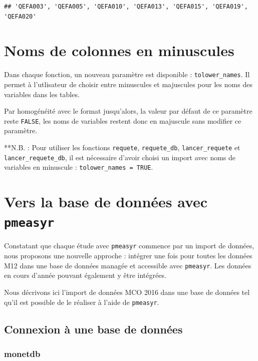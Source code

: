 \documentclass[]{book}
\theoremstyle{definition}
\theoremstyle{definition}
\theoremstyle{definition}
\theoremstyle{remark}
\begin{document}
\begin{verbatim}
## 'QEFA003', 'QEFA005', 'QEFA010', 'QEFA013', 'QEFA015', 'QEFA019', 'QEFA020'
\end{verbatim}

\chapter{Noms de colonnes en
minuscules}\label{noms-de-colonnes-en-minuscules}

Dans chaque fonction, un nouveau paramètre est disponible :
\texttt{tolower\_names}. Il permet à l'utlisateur de choisir entre
minuscules et majuscules pour les noms des variables dans les tables.

Par homogénéité avec le format jusqu'alors, la valeur par défaut de ce
paramètre reste \texttt{FALSE}, les noms de variables restent donc en
majuscule sans modifier ce paramètre.

**N.B. : Pour utiliser les fonctions \texttt{requete},
\texttt{requete\_db}, \texttt{lancer\_requete} et
\texttt{lancer\_requete\_db}, il est nécessaire d'avoir choisi un import
avec noms de variables en minuscule : \texttt{tolower\_names\ =\ TRUE}.

\chapter{\texorpdfstring{Vers la base de données avec
\texttt{pmeasyr}}{Vers la base de données avec pmeasyr}}\label{vers-la-base-de-donnees-avec-pmeasyr}

Constatant que chaque étude avec \texttt{pmeasyr} commence par un import
de données, nous proposons une nouvelle approche : intégrer une fois
pour toutes les données M12 dans une base de données managée et
accessible avec \texttt{pmeasyr}. Les données en cours d'année pouvant
également y être intégrées.

Nous décrivons ici l'import de données MCO 2016 dans une base de données
tel qu'il est possible de le réaliser à l'aide de \texttt{pmeasyr}.

\section{Connexion à une base de
données}\label{connexion-a-une-base-de-donnees}

\subsection{monetdb}\label{monetdb}
\end{document}
